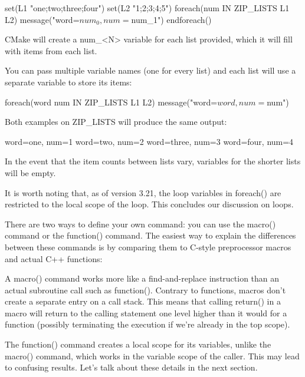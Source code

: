 
\begin{cmake}
set(L1 "one;two;three;four")
set(L2 "1;2;3;4;5")
foreach(num IN ZIP_LISTS L1 L2)
    message("word=${num_0}, num=${num_1}")
endforeach()
\end{cmake}

CMake will create a num\_<N> variable for each list provided, which it will fill with items from each list.

You can pass multiple variable names (one for every list) and each list will use a separate variable to store its items:

\begin{cmake}
foreach(word num IN ZIP_LISTS L1 L2)
    message("word=${word}, num=${num}")
\end{cmake}

Both examples on ZIP\_LISTS will produce the same output:

\begin{shell}
word=one, num=1
word=two, num=2
word=three, num=3
word=four, num=4
\end{shell}

In the event that the item counts between lists vary, variables for the shorter lists will be empty.

It is worth noting that, as of version 3.21, the loop variables in foreach() are restricted to the local scope of the loop. This concludes our discussion on loops.


There are two ways to define your own command: you can use the macro() command or the function() command. The easiest way to explain the differences between these commands is by comparing them to C-style preprocessor macros and actual C++ functions:

A macro() command works more like a find-and-replace instruction than an actual subroutine call such as function(). Contrary to functions, macros don’t create a separate entry on a call stack.
This means that calling return() in a macro will return to the calling statement one level higher than it would for a function (possibly terminating the execution if we’re already in the top scope).

The function() command creates a local scope for its variables, unlike the macro() command, which works in the variable scope of the caller. This may lead to confusing results. Let’s talk about these details in the next section.

